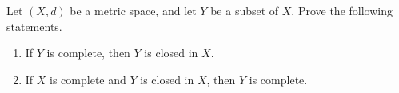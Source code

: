 \documentclass[12pt,letterpaper,boxed]{hmcpset}
\begin{document}
\begin{solution}

\end{solution}

\begin{problem}[Exercise 2.18]
Let $(X, d)$ be a metric space, and let $Y$ be a subset of $X$. Prove the following statements. 
\vspace{-2mm}
	\begin{enumerate}
		\itemsep0em
		\item If $Y$ is complete, then $Y$ is closed in $X$.
		\item If $X$ is complete and $Y$ is closed in $X$, then $Y$ is complete.
	\end{enumerate}
\end{problem}

\begin{solution}

\end{solution}
\end{document}
